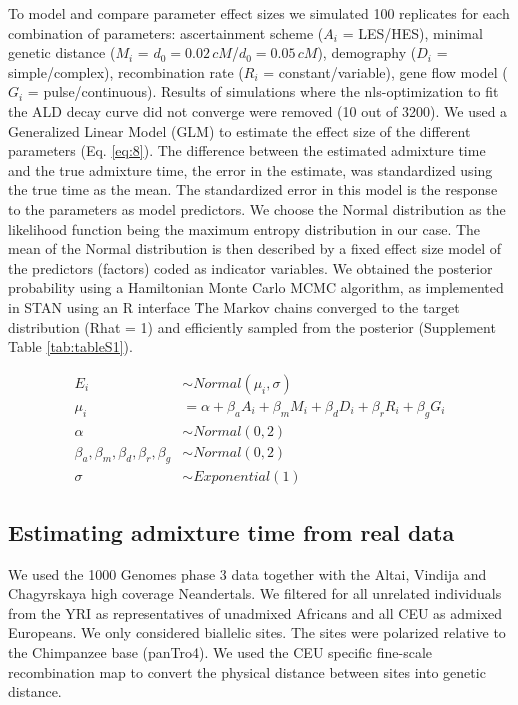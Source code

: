 \documentclass[]{article}
\begin{document}
To model and compare parameter effect sizes we simulated 100
replicates for each combination of
parameters: ascertainment scheme ($A_i$ = LES/HES), minimal genetic distance
($M_i$ = \(d_{0}=0.02\,cM\)/\(d_{0}=0.05\,cM\)), demography ($D_i$ = simple/complex),
recombination rate ($R_i$ = constant/variable), gene flow model
($G_i$ = pulse/continuous). Results of simulations where the nls-optimization to
fit the ALD decay curve did not converge were removed (10 out of 3200).
We used a Generalized Linear Model (GLM)  to estimate the effect
size of the different parameters (Eq.
\ref{eq:8}). The difference between the estimated
admixture time and the true admixture time, the error in the estimate,
was standardized using the true time as the mean. The standardized error in this model is the response to the parameters as model
predictors. We choose the Normal distribution as the likelihood function being the maximum entropy distribution in our case. The mean of the Normal distribution is then described by a fixed effect size model of the predictors (factors) coded as indicator variables. We obtained the posterior probability using a Hamiltonian Monte Carlo MCMC algorithm, as implemented in STAN using an R interface \. The Markov chains converged to the target distribution (Rhat = 1) and efficiently sampled from the posterior (Supplement Table \ref{tab:tableS1}).  

\begin{equation}\label{eq:8}
\begin{split}
E_i &\sim Normal(\mu_i,\sigma) \\
\mu_i &= \alpha + \beta_aA_i + \beta_mM_i + \beta_dD_i + \beta_rR_i + \beta_gG_i \\
\alpha &\sim Normal(0,2) \\
\beta_a,\beta_m,\beta_d,\beta_r,\beta_g &\sim Normal(0,2) \\
\sigma &\sim Exponential(1)
\end{split}
\end{equation}

\subsection{Estimating admixture time from real data}\label{Estimating admixture time from real data}

We used the 1000 Genomes phase 3 data together with the Altai, Vindija and Chagyrskaya high coverage Neandertals.  We filtered for all unrelated individuals from the YRI as representatives of unadmixed Africans and all CEU as admixed Europeans. We only considered biallelic sites. The sites were polarized relative to the Chimpanzee base (panTro4). We used the CEU specific fine-scale recombination map \citep{spence_inference_2019} to convert the physical distance between sites into genetic distance. 
\end{document}
